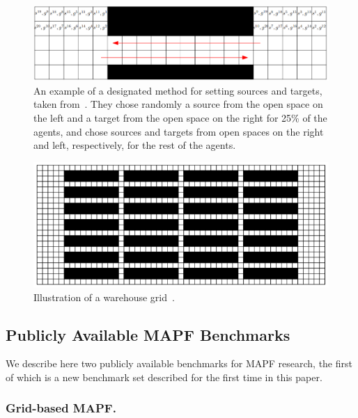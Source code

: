\documentclass[letterpaper]{article} %
\newcommand{\mapf}{\ac{MAPF}\xspace}
\begin{document}
\begin{figure}[tb]
    \centering
    \includegraphics[width=\columnwidth]{designated.PNG}
    \caption{An example of a designated method for setting sources and targets, taken from~\cite{DBLP:conf/socs/CohenUK15}. They chose randomly a source from the open space on the left and a target from the open space on the right for 25\% of the agents, and chose sources and targets from open spaces on the right and left, respectively, for the rest of the agents.}
\end{figure}

\begin{figure}[tb]
    \centering
    \includegraphics[width=\columnwidth]{warehouse.PNG}
    \caption{Illustration of a warehouse grid~\cite{CWKKCS:AAMAS:18}.}
\end{figure}



\subsection{Publicly Available \mapf Benchmarks}

We describe here two publicly available benchmarks for \mapf research, the first of which is a new benchmark set described for the first time in this paper.

\subsubsection{Grid-based \mapf.}
\end{document}
